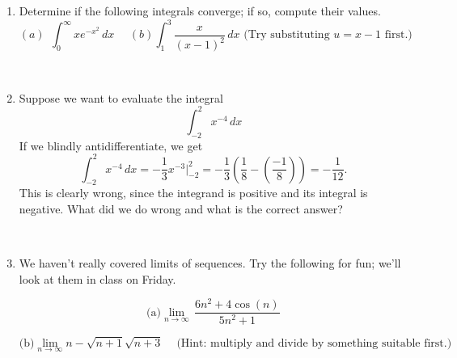 \documentclass[11pt, oneside]{article}   	%
\title{}
\author{Week 8 discussion problems}
\date{}							%
\begin{document}
\maketitle

\begin{enumerate}

 
 \item Determine if the following integrals converge; if so, compute their values.
$$(a) \ \  \int_0^{\infty} x e^{-x^2} \, dx  \ \ \ \ \ \ (b) \int_{1}^3 \dfrac{x}{{(x-1)^2}}  \, dx \textrm{   (Try substituting $u=x-1$ first.) }$$

 \
 
 \item
 Suppose we want to  evaluate the integral 
 $$\int_{-2}^2  x^{-4} \, dx$$
 If we blindly antidifferentiate, we get 
 $$\int_{-2}^2  x^{-4} \, dx= -\dfrac{1}{3}  x^{-3}  \Big|_{-2}^2=  -\dfrac{1}{3}\left( \dfrac{1}{8}-\left(\dfrac{-1}{8} \right)\right) =  -\dfrac{1}{12}.$$
 This is clearly wrong, since the  integrand is positive and its integral is negative.  What did we do wrong and  what is the correct answer?

\

\item We haven't really covered limits of sequences. Try the following for fun; we'll look at them in class on Friday.

$$\textrm{(a)} \lim_{n \to \infty} \, \dfrac{6n^2+4\cos(n)}{5n^2+1} $$

$${ \textrm{(b)}   \lim_{n \to \infty} n-\sqrt{n+1} \sqrt{n+3} \ \ \ \ \textrm{      (Hint:  multiply and divide by something suitable first.) }}$$

\end{enumerate}
\end{document}
